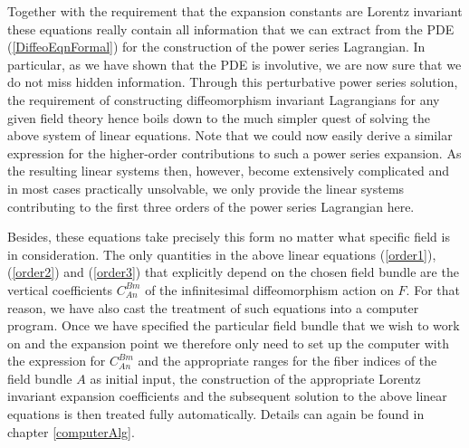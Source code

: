 Together with the requirement that the expansion constants are Lorentz invariant these equations really contain all information that we can extract from the PDE (\ref{DiffeoEqnFormal}) for the construction of the power series Lagrangian. In particular, as we have shown that the PDE is involutive, we are now sure that we do not miss hidden information. Through this perturbative power series solution, the requirement of constructing diffeomorphism invariant Lagrangians for any given field theory hence boils down to the much simpler quest of solving the above system of linear equations.
Note that we could now easily derive a similar expression for the higher-order contributions to such a power series expansion. As the resulting linear systems then, however, become extensively complicated and in most cases practically unsolvable, we only provide the linear systems contributing to the first three orders of the power series Lagrangian here. 

Besides, these equations take precisely this form no matter what specific field is in consideration. The only quantities in the above linear equations (\ref{order1}), (\ref{order2}) and (\ref{order3}) that explicitly depend on the chosen field bundle are the vertical coefficients $C^{Bm}_{An}$ of the infinitesimal diffeomorphism action on $F$. For that reason, we have also cast the treatment of such equations into a computer program. Once we have specified the particular field bundle that we wish to work on and the expansion point we therefore only need to set up the computer with the expression for $C_{An}^{Bm}$ and the appropriate ranges for the fiber indices of the field bundle $A$ as initial input, the construction of the appropriate Lorentz invariant expansion coefficients and the subsequent solution to the above linear equations is then treated fully automatically. Details can again be found in chapter \ref{computerAlg}. 

